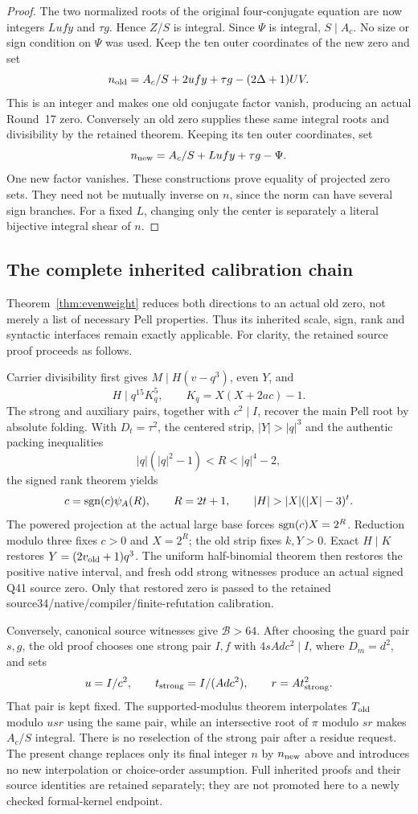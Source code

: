 \begin{proof}
The two normalized roots of the original four-conjugate equation are now
integers $Lufy$ and $\tau g$. Hence $Z/S$ is integral. Since $\Psi$
is integral, $S\mid A_c$. No size or sign condition on $\Psi$ was used.
Keep the ten outer coordinates of the new zero and set
\[
 n_{\rm old}=A_c/S+2ufy+\tau g-(2\Delta+1)UV.
\]
This is an integer and makes one old conjugate factor vanish, producing an
actual Round~17 zero. Conversely an old zero supplies these same integral
roots and divisibility by the retained theorem. Keeping its ten outer
coordinates, set
\[
 n_{\rm new}=A_c/S+Lufy+\tau g-\Psi.
\]
One new factor vanishes. These constructions prove equality of projected
zero sets. They need not be mutually inverse on $n$, since the norm can
have several sign branches. For a fixed $L$, changing only the center is
separately a literal bijective integral shear of $n$.
\end{proof}

\subsection{The complete inherited calibration chain}
Theorem~\ref{thm:evenweight} reduces both directions to an actual old
zero, not merely a list of necessary Pell properties. Thus its inherited
scale, sign, rank and syntactic interfaces remain exactly applicable.
For clarity, the retained source proof proceeds as follows.

Carrier divisibility first gives $M\mid H(v-q^3)$, even $Y$, and
\[
 H\mid q^{15}K_q^5,\qquad K_q=X(X+2ac)-1.
\]
The strong and auxiliary pairs, together with $c^2\mid I$, recover the
main Pell root by absolute folding. With $D_t=\tau^2$, the centered
strip, $|Y|>|q|^3$ and the authentic packing inequalities
\[
 |q|(|q|^2-1)<R<|q|^4-2,
\]
the signed rank theorem yields
\[
 c=\sgn(c)\psi_A(R),\qquad R=2t+1,
 \qquad |H|>|X|(|X|-3)^t.
\]
The powered projection at the actual large base forces
$\operatorname{sgn}(c)X=2^R$. Reduction modulo three fixes $c>0$ and $X=2^R$;
the old strip fixes $k,Y>0$. Exact $H\mid K$ restores
$Y=(2v_{\rm old}+1)q^3$. The uniform half-binomial theorem then restores
the positive native interval, and fresh odd strong witnesses produce an
actual signed Q41 source zero. Only that restored zero is passed to the
retained source34/native/compiler/finite-refutation calibration.

Conversely, canonical source witnesses give $\mathcal B>64$.
After choosing the guard pair $s,g$, the old proof chooses one strong
pair $I,f$ with $4sAdc^2\mid I$, where $D_m=d^2$, and sets
\[
 u=I/c^2,\qquad t_{\rm strong}=I/(Adc^2),\qquad
 r=At_{\rm strong}^2.
\]
That pair is kept fixed. The supported-modulus theorem interpolates
$T_{\rm old}$ modulo $usr$ using the same pair, while an intersective
root of $\pi$ modulo $sr$ makes $A_c/S$ integral. There is no reselection
of the strong pair after a residue request. The present change replaces
only its final integer $n$ by $n_{\rm new}$ above and introduces no new
interpolation or choice-order assumption. Full inherited proofs and their
source identities are retained separately; they are not promoted here to
a newly checked formal-kernel endpoint.


